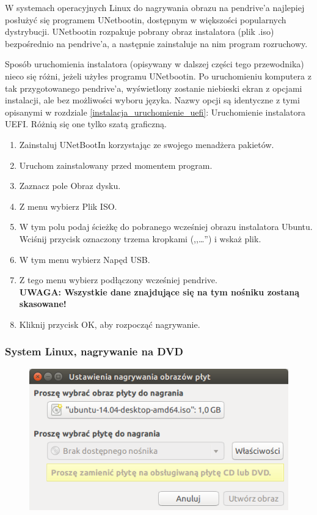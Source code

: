 W systemach operacyjnych Linux do nagrywania obrazu na pendrive'a najlepiej posłużyć się programem \textcolor{ubuntu_orange}{UNetbootin}, dostępnym w większości popularnych dystrybucji. UNetbootin rozpakuje pobrany obraz instalatora (plik .iso) bezpośrednio na pendrive'a, a następnie zainstaluje na nim program rozruchowy.

Sposób uruchomienia instalatora (opisywany w dalszej części tego przewodnika) nieco się różni, jeżeli użyłes programu UNetbootin. Po uruchomieniu komputera z tak przygotowanego pendrive'a, wyświetlony zostanie niebieski ekran z opcjami instalacji, ale bez możliwości wyboru języka. Nazwy opcji są identyczne z tymi opisanymi w rozdziale \ref{instalacja_uruchomienie_uefi}: Uruchomienie instalatora UEFI. Różnią się one tylko szatą graficzną.
\begin{enumerate}[label=\protect\circled{\arabic*}]
\item Zainstaluj UNetBootIn korzystając ze swojego menadżera pakietów.
\item Uruchom zainstalowany przed momentem program.
\item Zaznacz pole Obraz dysku.
\item Z menu wybierz Plik ISO.
\item W tym polu podaj ścieżkę do pobranego wcześniej obrazu instalatora Ubuntu. Wciśnij przycisk oznaczony trzema kropkami (,,\ldots'') i wskaż plik.
\item W tym menu wybierz Napęd USB.
\item Z tego menu wybierz podłączony wcześniej pendrive.\\
\textbf{UWAGA: Wszystkie dane znajdujące się na tym nośniku zostaną skasowane!}
\item Kliknij przycisk \textcolor{ubuntu_orange}{OK}, aby rozpocząć nagrywanie.
\end{enumerate}

\subsubsection{System Linux, nagrywanie na DVD}
\begin{figure}
	\vspace{-10pt}
	\includegraphics[width=\linewidth]{images/instalacja_nagrywanie_obrazu_linux_DVD.png}
\end{figure}

